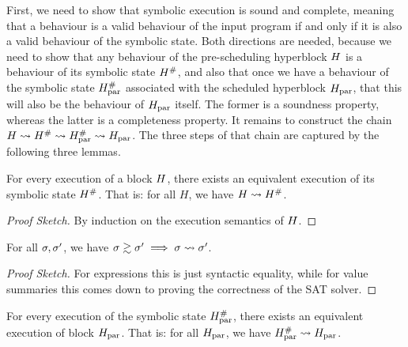{First, we need to show that symbolic execution is sound and complete, meaning
that a behaviour is a valid behaviour of the input program if and only if it is
also a valid behaviour of the symbolic state.  Both directions are needed,
because we need to show that any behaviour of the pre-scheduling hyperblock
$H$ is a behaviour of its symbolic state $H^{\#}$, and also that
once we have a behaviour of the symbolic state $H_\text{par}^{\#}$ associated
with the scheduled hyperblock $H_\text{par}$, that this will also be the behaviour of
$H_\text{par}$ itself.  The former is a soundness property, whereas the latter is a
completeness property.  It remains to construct the chain
$H \mathrel{\leadsto} H^{\#} \mathrel{\leadsto} H_\text{par}^{\#} \mathrel{\leadsto} H_\text{par}$. The
three steps of that chain are captured by the following three lemmas.

\begin{lemma}\label{thm:soundness}
  For every execution of a block $H$, there exists an equivalent execution
  of its symbolic state $H^{\#}$. That is: for all $H$, we have
  $H \mathrel{\leadsto} H^{\#}$.

  \begin{proof}[Proof Sketch]
    By induction on the execution semantics of $H$.
  \end{proof}
\end{lemma}

\begin{lemma}\label{thm:correctness} For all $\sigma, \sigma'$, we have
  $\sigma \gtrsim
    \sigma' \implies \sigma \mathrel{\leadsto} \sigma'$.

  \begin{proof}[Proof Sketch] For
    expressions this is just syntactic equality, while for value summaries
    this comes down to proving the correctness of the SAT solver.
  \end{proof}
\end{lemma}

\begin{lemma}\label{thm:completeness}
  For every execution of the symbolic state $H_\text{par}^{\#}$, there exists an
  equivalent execution of block $H_\text{par}$. That is: for all $H_\text{par}$, we have
  $H_\text{par}^{\#} \mathrel{\leadsto} H_\text{par}$.


\end{lemma}}

